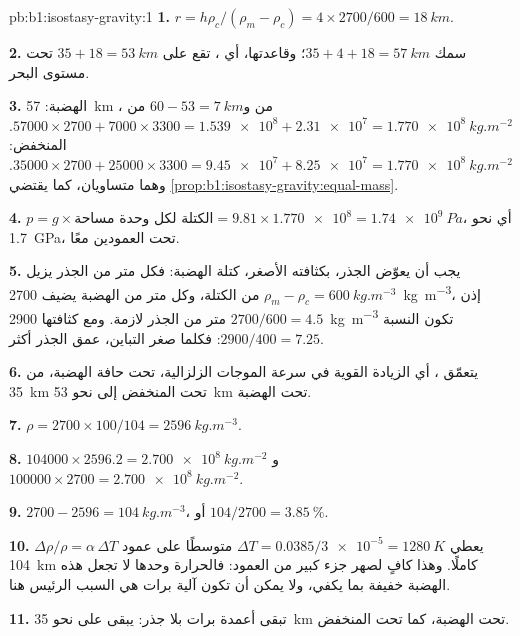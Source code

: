 \begin{solution}{pb:b1:isostasy-gravity:1}
\textbf{1.} $r = h\rho_c/(\rho_m - \rho_c) = 4\times2700/600 = \qty{18}{km}$.

\textbf{2.} سمك  $35 + 4 + 18 = \qty{57}{km}$؛ وقاعدتها، أي ، تقع على $35 + 18 = \qty{53}{km}$ تحت مستوى البحر.

\textbf{3.} الهضبة: \qty{57}{km} من  و$60 - 53 = \qty{7}{km}$ من ،
$\num{57000}\times2700 + \num{7000}\times3300 = \num{1.539e8} + \num{2.31e7} =
\qty{1.770e8}{kg.m^{-2}}$. المنخفض: $\num{35000}\times2700 + \num{25000}\times3300
= \num{9.45e7} + \num{8.25e7} = \qty{1.770e8}{kg.m^{-2}}$. وهما متساويان، كما
يقتضي \cref{prop:b1:isostasy-gravity:equal-mass}.

\textbf{4.} $p = g\times\text{الكتلة لكل وحدة مساحة} = 9.81\times\num{1.770e8} =
\qty{1.74e9}{Pa}$، أي نحو \qty{1.7}{GPa}، تحت العمودين معًا.

\textbf{5.} يجب أن يعوّض الجذر، بكثافته الأصغر، كتلة الهضبة: فكل متر من الجذر يزيل $\rho_m - \rho_c = \qty{600}{kg.m^{-3}}$ من الكتلة، وكل متر من الهضبة يضيف \qty{2700}{kg.m^{-3}}، إذن $2700/600 = 4.5$ متر من الجذر لازمة. ومع  كثافتها \qty{2900}{kg.m^{-3}} تكون النسبة $2900/400 = 7.25$: فكلما صغر التباين، عمق الجذر أكثر.

\textbf{6.} يتعمّق ، أي الزيادة القوية في سرعة الموجات الزلزالية، تحت حافة الهضبة، من \qty{35}{km} تحت المنخفض إلى نحو \qty{53}{km} تحت الهضبة.

\textbf{7.} $\rho = 2700\times100/104 = \qty{2596}{kg.m^{-3}}$.

\textbf{8.} $\num{104000}\times2596.2 = \qty{2.700e8}{kg.m^{-2}}$ و
$\num{100000}\times2700 = \qty{2.700e8}{kg.m^{-2}}$.

\textbf{9.} $2700 - 2596 = \qty{104}{kg.m^{-3}}$، أو $104/2700 =
\qty{3.85}{\percent}$.

\textbf{10.} $\Delta\rho/\rho = \alpha\,\Delta T$ يعطي $\Delta T =
0.0385/\num{3e-5} = \qty{1280}{K}$ متوسطًا على عمود \qty{104}{km} كاملًا. وهذا كافٍ لصهر جزء كبير من العمود: فالحرارة وحدها لا تجعل هذه الهضبة خفيفة بما يكفي، ولا يمكن أن تكون آلية برات هي السبب الرئيس هنا.

\textbf{11.} تبقى أعمدة برات بلا جذر: يبقى  على نحو \qty{35}{km} تحت الهضبة، كما تحت المنخفض.


\end{solution}

